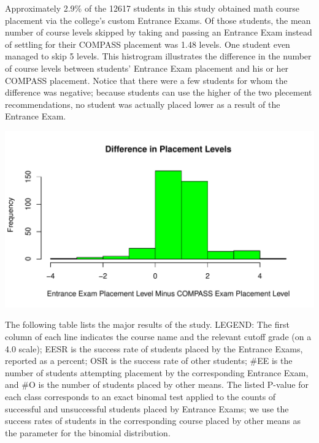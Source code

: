 \documentclass[twoside]{article}\usepackage[]{graphicx}\usepackage[]{color}
\makeatletter
\def\maxwidth{ %
  \ifdim\Gin@nat@width>\linewidth
    \linewidth
  \else
    \Gin@nat@width
  \fi
}
\newenvironment{knitrout}{}{} %
\makeatother
\begin{document}
Approximately 2.9\% of the 12617 students in this study obtained math course placement via the college's custom Entrance Exams.  Of those students, the mean number of course levels skipped by taking and passing an Entrance Exam instead of settling for their COMPASS placement was 1.48 levels.  One student even managed to skip 5 levels.  This histrogram illustrates the difference in the number of course levels between students' Entrance Exam placement and his or her COMPASS placement. Notice that there were a few students for whom the difference was negative; because students can use the higher of the two plecement recommendations, no student was actually placed lower as a result of the Entrance Exam.

\begin{knitrout}
\color{fgcolor}
\includegraphics[width=\maxwidth]{figure/histOfLevelsSkipped-1} 

\end{knitrout}


The following table lists the major results of the study.  LEGEND: The first column of each line indicates the course name and the relevant cutoff grade (on a 4.0 scale); EESR is the success rate of students placed by the Entrance Exams, reported as a percent; OSR is the success rate of other students; \#EE is the number of students attempting placement by the corresponding Entrance Exam, and \#O is the number of students placed by other means.  The listed P-value for each class corresponds to an exact binomal test applied to the counts of successful and unsuccessful students placed by Entrance Exams; we use the success rates of students in the corresponding course placed by other means as the parameter for the binomial distribution.
\end{document}
